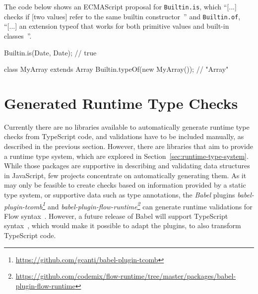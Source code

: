 \begin{program}
\caption{The code below shows an ECMAScript proposal for \texttt{Builtin.is}, which ``[...] checks if [two values] refer to the same builtin constructor~\cite{DynamicTypeChecks:Rauschmayer:2017}'' and \texttt{Builtin.of}, ``[...] an extension typeof that works for both primitive values and built-in classes~\cite{DynamicTypeChecks:Rauschmayer:2017}''.~\cites{DynamicTypeChecks:Rauschmayer:2017, BuiltinProposalRepo}}
\label{prog:runtime-checks-builtin}
\begin{JsCode}
Builtin.is(Date, Date); // true

class MyArray extends Array { }
Builtin.typeOf(new MyArray()); // "Array"
\end{JsCode}
\end{program}


\section{Generated Runtime Type Checks}
\label{sec:existing-projects}

Currently there are no libraries available to automatically generate runtime type checks from TypeScript code, and validations have to be included manually, as described in the previous section. However, there are libraries that aim to provide a runtime type system, which are explored in Section~\ref{sec:runtime-type-system}. While those packages are supportive in describing and validating data structures in JavaScript, few projects concentrate on automatically generating them. As it may only be feasible to create checks based on information provided by a static type system, or supportive data such as type annotations, the \emph{Babel} plugins \emph{babel-plugin-tcomb\footnote{\url{https://github.com/gcanti/babel-plugin-tcomb}}} and \emph{babel-plugin-flow-runtime\footnote{\url{https://github.com/codemix/flow-runtime/tree/master/packages/babel-plugin-flow-runtime}}} can generate runtime validations for Flow syntax~\cites{RuntimeTypeSystem:tcomb:babel, RuntimeTypeSystem:flow-runtime:babel}. However, a future release of Babel will support TypeScript syntax~\cite{Babel:TypeScript}, which would make it possible to adapt the plugins, to also transform TypeScript code.
